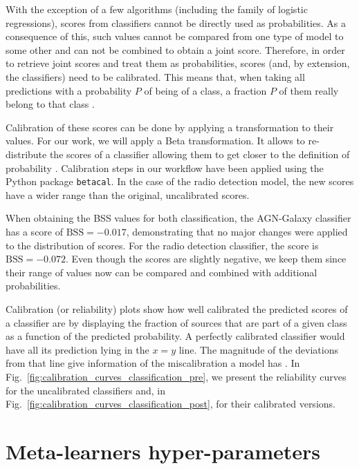 \documentclass{aa}
\begin{document}
\begin{appendix}
With the exception of a few algorithms (including the family of logistic regressions), scores from classifiers cannot be directly used as probabilities. As a consequence of this, such values cannot be compared from one type of model to some other and can not be combined to obtain a joint score.
Therefore, in order to retrieve joint scores and treat them as probabilities, scores (and, by extension, the classifiers) need to be calibrated. This means that, when taking all predictions with a probability $P$ of being of a class, a fraction $P$ of them really belong to that class \citep[e.g.][]{lichtenstein_1982, 2021arXiv211210327S}.

Calibration of these scores can be done by applying a transformation to their values. For our work, we will apply a Beta transformation. It allows to re-distribute the scores of a classifier allowing them to get closer to the definition of probability \citep{10.1214/17-EJS1338SI, pmlr-v54-kull17a}. Calibration steps in our workflow have been applied using the Python package \verb|betacal|. In the case of the radio detection model, the new scores have a wider range than the original, uncalibrated scores.%

When obtaining the BSS values for both classification, the AGN-Galaxy classifier has a score of ${\mathrm{BSS} = -0.017}$, demonstrating that no major changes were applied to the distribution of scores. For the radio detection classifier, the score is ${\mathrm{BSS} = -0.072}$. Even though the scores are slightly negative, we keep them since their range of values now can be compared and combined with additional probabilities.

Calibration (or reliability) plots show how well calibrated the predicted scores of a classifier are by displaying the fraction of sources that are part of a given class as a function of the predicted probability. A perfectly calibrated classifier would have all its prediction lying in the ${x{=}y}$ line. The magnitude of the deviations from that line give information of the miscalibration a model has \citep[see, for instance,][]{ReliabilityofReliabilityDiagrams, VanCalster2019}. In Fig.~\ref{fig:calibration_curves_classification_pre}, we present the reliability curves for the uncalibrated classifiers and, in Fig.~\ref{fig:calibration_curves_classification_post}, for their calibrated versions.

\section{Meta-learners hyper-parameters}\label{sec:app_hyperpars}


\end{appendix}
\end{document}
